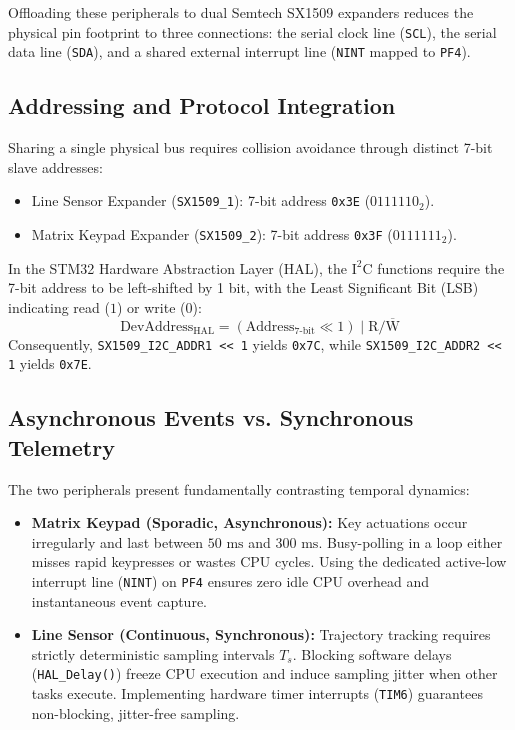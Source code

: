 Offloading these peripherals to dual Semtech SX1509 expanders reduces the physical pin footprint to three connections: the serial clock line (\texttt{SCL}), the serial data line (\texttt{SDA}), and a shared external interrupt line (\texttt{NINT} mapped to \texttt{PF4}).

\subsection{Addressing and Protocol Integration}
Sharing a single physical bus requires collision avoidance through distinct 7-bit slave addresses:
\begin{itemize}[noitemsep,topsep=2pt]
    \item Line Sensor Expander (\texttt{SX1509\_1}): 7-bit address \texttt{0x3E} ($0111110_2$).
    \item Matrix Keypad Expander (\texttt{SX1509\_2}): 7-bit address \texttt{0x3F} ($0111111_2$).
\end{itemize}
In the STM32 Hardware Abstraction Layer (HAL), the $\text{I}^2\text{C}$ functions require the 7-bit address to be left-shifted by 1 bit, with the Least Significant Bit (LSB) indicating read ($1$) or write ($0$):
\begin{equation}
    \text{DevAddress}_{\text{HAL}} = (\text{Address}_{\text{7-bit}} \ll 1) \mid \text{R}/\overline{\text{W}}
\end{equation}
Consequently, \texttt{SX1509\_I2C\_ADDR1 << 1} yields \texttt{0x7C}, while \texttt{SX1509\_I2C\_ADDR2 << 1} yields \texttt{0x7E}.

\subsection{Asynchronous Events vs. Synchronous Telemetry}
The two peripherals present fundamentally contrasting temporal dynamics:
\begin{itemize}[noitemsep,topsep=2pt]
    \item \textbf{Matrix Keypad (Sporadic, Asynchronous):} Key actuations occur irregularly and last between $50\text{ ms}$ and $300\text{ ms}$. Busy-polling in a loop either misses rapid keypresses or wastes CPU cycles. Using the dedicated active-low interrupt line (\texttt{NINT}) on \texttt{PF4} ensures zero idle CPU overhead and instantaneous event capture.
    \item \textbf{Line Sensor (Continuous, Synchronous):} Trajectory tracking requires strictly deterministic sampling intervals $T_s$. Blocking software delays (\texttt{HAL\_Delay()}) freeze CPU execution and induce sampling jitter when other tasks execute. Implementing hardware timer interrupts (\texttt{TIM6}) guarantees non-blocking, jitter-free sampling.
\end{itemize}

